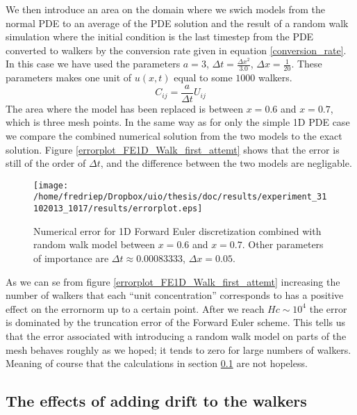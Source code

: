 We then introduce an area on the domain where we swich models from the normal PDE to an average of the PDE solution and the result of a random walk simulation where the initial condition is the last timestep from the PDE converted to walkers by the conversion rate given in equation \ref{conversion_rate}. In this case we have used the parameters $a=3$, $\Delta t = \frac{\Delta x^2}{3.0}$, $\Delta x = \frac{1}{20}$. 
These parameters makes one unit of $u(x,t)$ equal to some $1000$ walkers. 
\begin{equation}\label{conversion_rate}
 C_{ij} = \frac{a}{\Delta t}U_{ij}
\end{equation}
The area where the model has been replaced is between $x=0.6$ and $x=0.7$, which is three mesh points. 
In the same way as for only the simple 1D PDE case we compare the combined numerical solution from the two models to the exact solution. 
Figure \ref{errorplot_FE1D_Walk_first_attemt} shows that the error is still of the order of $\Delta t$, and the difference between the two models are negligable. 
\begin{figure}[H]
\centering
\texttt{[image: /home/fredriep/Dropbox/uio/thesis/doc/results/experiment\_31102013\_1017/results/errorplot.eps]}
\caption[Effect of increasing number of walkers]{Numerical error for 1D Forward Euler discretization combined with random walk model between $x=0.6$ and $x=0.7$. Other parameters of importance are $\Delta t\approx 0.00083333$, $\Delta x = 0.05$.}
\end{figure}
As we can se from figure \ref{errorplot_FE1D_Walk_first_attemt} increasing the number of walkers that each ``unit concentration'' corresponds to has a positive effect on the errornorm up to a certain point. 
After we reach $Hc \sim 10^4$ the error is dominated by the truncation error of the Forward Euler scheme. 
This tells us that the error associated with introducing a random walk model on parts of the mesh behaves roughly as we hoped; it tends to zero for large numbers of walkers. 
Meaning of course that the calculations in section \ref{} are not hopeless.

\subsection{The effects of adding drift to the walkers}

